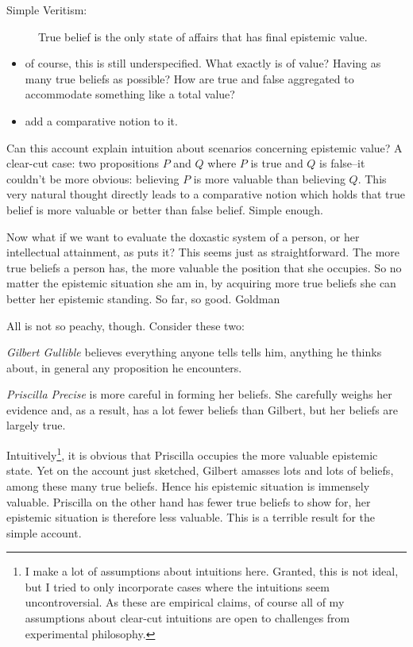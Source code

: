 \documentclass[12pt,numbers=noenddot]{scrartcl}
\begin{document}
\begin{description}
    \item[Simple Veritism:] True belief is the only state of affairs that has final epistemic value.
\end{description}

\begin{itemize}
    \item of course, this is still underspecified. What exactly is of value? Having as many true beliefs as possible? How are true and false aggregated to accommodate something like a total value?
    \item add a comparative notion to it.
\end{itemize}

Can this account explain intuition about scenarios concerning epistemic value?  A clear-cut case: two propositions $P$ and $Q$ where $P$ is true and $Q$ is false–it couldn't be more obvious: believing $P$ is more valuable than believing $Q$. This very natural thought directly leads to a comparative notion which holds that true belief is more valuable or better than false belief. Simple enough.

Now what if we want to evaluate the doxastic system of a person, or her intellectual attainment, as \textcite[58]{Goldman2002-GOLTUO-2} puts it? This seems just as straightforward. The more true beliefs a person has, the more valuable the position that she occupies. So no matter the epistemic situation she am in, by acquiring more true beliefs she can better her epistemic standing. So far, so good. Goldman\textcite[59]{Goldman2002-GOLTUO-2}

All is not so peachy, though. Consider these two:
\begin{description}
    \item \emph{Gilbert Gullible} believes everything anyone tells tells him, anything he thinks about, in general any proposition he encounters.
    \item \emph{Priscilla Precise} is more careful in forming her beliefs. She carefully weighs her evidence and, as a result, has a lot fewer beliefs than Gilbert, but her beliefs are largely true.
\end{description}

Intuitively\footnote{I make a lot of assumptions about intuitions here. Granted, this is not ideal, but I tried to only incorporate cases where the intuitions seem uncontroversial. As these are empirical claims, of course all of my assumptions about clear-cut intuitions are open to challenges from experimental philosophy.}, it is obvious that Priscilla occupies the more valuable epistemic state. Yet on the account just sketched, Gilbert amasses lots and lots of beliefs, among these many true beliefs. Hence his epistemic situation is immensely valuable. Priscilla on the other hand has fewer true beliefs to show for, her epistemic situation is therefore less valuable. This is a terrible result for the simple account.
\end{document}
